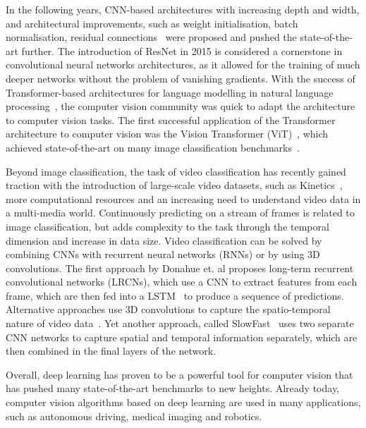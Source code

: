 \documentclass[a4paper]{article}
\begin{document}
  In the following years, CNN-based architectures with increasing depth and
  width, and architectural improvements, such as weight initialisation, batch
  normalisation, residual connections~\cite{vgg, googlenet, resnet, xception}
  were proposed and pushed the state-of-the-art further. The introduction of
  ResNet in 2015 is considered a cornerstone in convolutional neural networks
  architectures, as it allowed for the training of much deeper networks without
  the problem of vanishing gradients. With the success of Transformer-based
  architectures for language modelling in natural language
  processing~\cite{transformer}, the computer vision community was quick to
  adapt the architecture to computer vision tasks. The first successful
  application of the Transformer architecture to computer vision was the Vision
  Transformer (ViT)~\cite{vit}, which achieved state-of-the-art on many image
  classification benchmarks~\cite{imagenet}.

  Beyond image classification, the task of video classification has recently
  gained traction with the introduction of large-scale video datasets, such as
  Kinetics~\cite{kinetics}, more computational resources and an increasing need
  to understand video data in a multi-media world. Continuously predicting on a
  stream of frames is related to image classification, but adds complexity to
  the task through the temporal dimension and increase in data size. Video
  classification can be solved by combining CNNs with recurrent neural networks
  (RNNs) or by using 3D convolutions. The first approach by Donahue et. al
  proposes long-term recurrent convolutional networks (LRCNs), which use a CNN
  to extract features from each frame, which are then fed into a
  LSTM~\cite{lrcn} to produce a sequence of predictions. Alternative approaches
  use 3D convolutions to capture the spatio-temporal nature of video
  data~\cite{c3d, i3d}. Yet another approach, called SlowFast~\cite{slowfast}
  uses two separate CNN networks to capture spatial and temporal information
  separately, which are then combined in the final layers of the network.

  Overall, deep learning has proven to be a powerful tool for computer vision
  that has pushed many state-of-the-art benchmarks to new heights. Already
  today, computer vision algorithms based on deep learning are used in many
  applications, such as autonomous driving, medical imaging and robotics.

\end{document}
